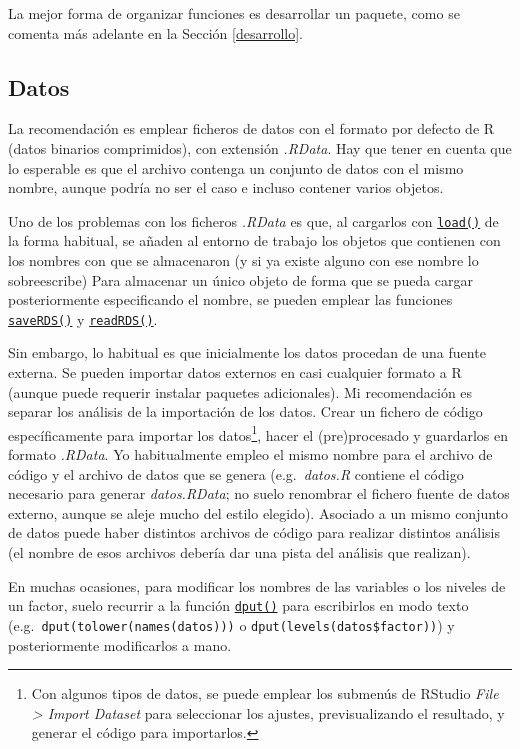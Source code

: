 \documentclass[
]{book}
\theoremstyle{break}
\theoremstyle{nonumberplain}
\let\oldfootnote\footnote
\renewcommand\footnote[1]{\oldfootnote{\hspace{2mm}#1}}
\begin{document}
La mejor forma de organizar funciones es desarrollar un paquete, como se comenta más adelante en la Sección \ref{desarrollo}.

\subsection{Datos}\label{datos}

La recomendación es emplear ficheros de datos con el formato por defecto de R (datos binarios comprimidos), con extensión \emph{.RData}.
Hay que tener en cuenta que lo esperable es que el archivo contenga un conjunto de datos con el mismo nombre, aunque podría no ser el caso e incluso contener varios objetos.

Uno de los problemas con los ficheros \emph{.RData} es que, al cargarlos con \href{https://rdrr.io/r/base/load.html}{\texttt{load()}} de la forma habitual, se añaden al entorno de trabajo los objetos que contienen con los nombres con que se almacenaron (y si ya existe alguno con ese nombre lo sobreescribe)
Para almacenar un único objeto de forma que se pueda cargar posteriormente especificando el nombre, se pueden emplear las funciones \href{https://rdrr.io/r/base/readRDS.html}{\texttt{saveRDS()}} y \href{https://rdrr.io/r/base/readRDS.html}{\texttt{readRDS()}}.

Sin embargo, lo habitual es que inicialmente los datos procedan de una fuente externa.
Se pueden importar datos externos en casi cualquier formato a R (aunque puede requerir instalar paquetes adicionales).
Mi recomendación es separar los análisis de la importación de los datos.
Crear un fichero de código específicamente para importar los datos\footnote{Con algunos tipos de datos, se puede emplear los submenús de RStudio \emph{File \textgreater{} Import Dataset} para seleccionar los ajustes, previsualizando el resultado, y generar el código para importarlos.}, hacer el (pre)procesado y guardarlos en formato \emph{.RData}.
Yo habitualmente empleo el mismo nombre para el archivo de código y el archivo de datos que se genera (e.g.~\emph{datos.R} contiene el código necesario para generar \emph{datos.RData}; no suelo renombrar el fichero fuente de datos externo, aunque se aleje mucho del estilo elegido).
Asociado a un mismo conjunto de datos puede haber distintos archivos de código para realizar distintos análisis (el nombre de esos archivos debería dar una pista del análisis que realizan).

En muchas ocasiones, para modificar los nombres de las variables o los niveles de un factor, suelo recurrir a la función \href{https://rdrr.io/r/base/dput.html}{\texttt{dput()}} para escribirlos en modo texto (e.g.~\texttt{dput(tolower(names(datos)))} o \texttt{dput(levels(datos\$factor))}) y posteriormente modificarlos a mano.
\end{document}
